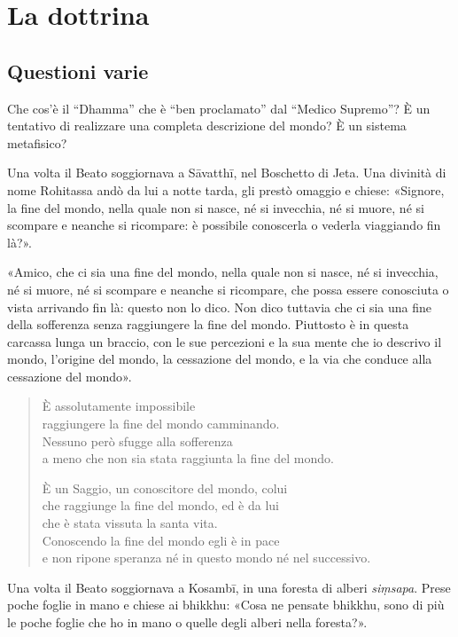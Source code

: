 \chapter{La dottrina}

\section*{Questioni varie}

 Che cos’è il “Dhamma” che è “ben proclamato” dal
“Medico Supremo”? È un tentativo di realizzare una completa descrizione del
mondo? È un sistema metafisico?

 Una volta il Beato soggiornava a Sāvatthī, nel Boschetto di
Jeta. Una divinità di nome Rohitassa andò da lui a notte tarda, gli prestò
omaggio e chiese: «Signore, la fine del mondo, nella quale non si nasce, né si
invecchia, né si muore, né si scompare e neanche si ricompare: è possibile
conoscerla o vederla viaggiando fin là?».

«Amico, che ci sia una fine del mondo, nella quale non si nasce, né si
invecchia, né si muore, né si scompare e neanche si ricompare, che possa essere
conosciuta o vista arrivando fin là: questo non lo dico. Non dico tuttavia che
ci sia una fine della sofferenza senza raggiungere la fine del mondo. Piuttosto
è in questa carcassa lunga un braccio, con le sue percezioni e la sua mente che
io descrivo il mondo, l’origine del mondo, la cessazione del mondo, e la via che
conduce alla cessazione del mondo».

\begin{quote}
È assolutamente impossibile \\
raggiungere la fine del mondo camminando. \\
Nessuno però sfugge alla sofferenza \\
a meno che non sia stata raggiunta la fine del mondo.

È un Saggio, un conoscitore del mondo, colui \\
che raggiunge la fine del mondo, ed è da lui \\
che è stata vissuta la santa vita. \\
Conoscendo la fine del mondo egli è in pace \\
e non ripone speranza né in questo mondo né nel successivo.
\end{quote}


Una volta il Beato soggiornava a Kosambī, in una foresta di alberi
\emph{siṃsapa}. Prese poche foglie in mano e chiese ai bhikkhu: «Cosa ne pensate
bhikkhu, sono di più le poche foglie che ho in mano o quelle degli alberi nella
foresta?».

